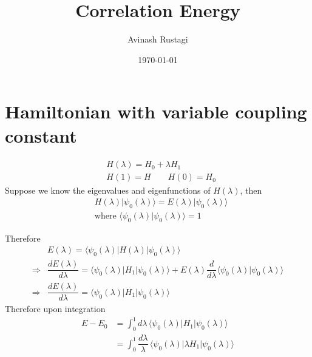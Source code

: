 \documentclass[aps,prb,onecolumn,notitlepage,showpacs,floatfix,superscriptaddress]{revtex4-1}
\begin{document}
\title{Correlation Energy}

\author{Avinash Rustagi}
%
\date{\today}

\maketitle

\section{Hamiltonian with variable coupling constant}
\begin{equation}
\begin{split}
&H(\lambda)=H_{0}+\lambda H_{1} \\
&H(1)=H \qquad H(0)=H_{0}
\end{split}
\end{equation}
Suppose we know the eigenvalues and eigenfunctions of $H(\lambda)$, then
\begin{equation}
\begin{split}
&H(\lambda) \vert \psi_{0}(\lambda) \rangle = E(\lambda) \vert \psi_{0}(\lambda) \rangle \\
&\text{where  } \langle \psi_{0}(\lambda) \vert \psi_{0}(\lambda) \rangle =1
\end{split}
\end{equation}

Therefore
\begin{equation}
\begin{split}
&E(\lambda) = \langle \psi_{0}(\lambda) \vert  H(\lambda)\vert \psi_{0}(\lambda) \rangle \\
\Rightarrow &\dfrac{dE(\lambda)}{d\lambda}= \langle \psi_{0}(\lambda) \vert  H_{1} \vert \psi_{0}(\lambda) \rangle + E(\lambda) \dfrac{d}{d\lambda} \langle \psi_{0}(\lambda) \vert \psi_{0}(\lambda) \rangle \\
\Rightarrow &\dfrac{dE(\lambda)}{d\lambda}= \langle \psi_{0}(\lambda) \vert  H_{1} \vert \psi_{0}(\lambda) \rangle 
\end{split}
\end{equation}
Therefore upon integration
\begin{equation}
\begin{split}
E-E_{0} &= \int_{0}^{1} d\lambda \, \langle \psi_{0}(\lambda) \vert  H_{1} \vert \psi_{0}(\lambda) \rangle \\
&= \int_{0}^{1} \dfrac{d\lambda}{\lambda} \, \langle \psi_{0}(\lambda) \vert  \lambda H_{1} \vert \psi_{0}(\lambda) \rangle 
\end{split}
\end{equation}
\end{document}
